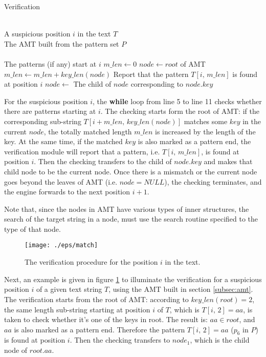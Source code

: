 \documentclass{article}
\begin{document}
\begin{algorithm}
  \caption{Verification}\scriptsize
  \label{alg:matching}
  \begin{algorithmic}[1]
    \REQUIRE ~~\\
    A suspicious position $i$ in the text $T$\\
    The AMT built from the pattern set $P$\\
    \ENSURE ~~\\
    The patterns (if any) start at $i$
    \STATE
    \STATE $m\_len \leftarrow 0$
    \STATE $node \leftarrow root$ of AMT
    \STATE
    \STATE $m\_len \leftarrow m\_len + key\_len(node)$
    \STATE Report that the pattern $T[i,\,m\_len]$ is found at position $i$
    \ENDIF
    \STATE $node \leftarrow$ The child of $node$ corresponding to $node.key$
    \ENDWHILE
  \end{algorithmic}
\end{algorithm}

For the suspicious position $i$, the \textbf{while} loop from line 5
to line 11 checks whether there are patterns starting at $i$. The
checking starts form the root of AMT: if the corresponding sub-string
$T[i+m\_len, \, key\_len(node)]$ matches some $key$ in the current
$node$, the totally matched length $m\_len$ is increased by the length
of the key. At the same time, if the matched $key$ is also marked as a
pattern end, the verification module will report that a pattern,
i.e. $T[i,\,m\_len]$, is found at position $i$. Then the checking
transfers to the child of $node.key$ and makes that child node to be
the current node. Once there is a mismatch or the current node goes
beyond the leaves of AMT (i.e.  $node = NULL$), the checking
terminates, and the engine forwards to the next position $i+1$.

Note that, since the nodes in AMT have various types of inner
structures, the search of the target string in a node, must use the
search routine specified to the type of that node.

\begin{figure}[htbp]
  \centering
  \texttt{[image: ./eps/match]}
  \caption{The verification procedure for the position $i$ in the
    text.}
  \label{fig:matching}
\end{figure}

Next, an example is given in figure \ref{fig:matching} to illuminate
the verification for a suspicious position $i$ of a given text string
$T$, using the AMT built in section \ref{subsec:amt}. The verification
starts from the root of AMT: according to $key\_len(root)=2$, the same
length sub-string starting at position $i$ of $T$, which is
$T[i,\,2]=aa$, is taken to check whether it's one of the keys in
root. The result is: $aa \in root$, and $aa$ is also marked as a
pattern end. Therefore the pattern $T[i,\,2]=aa$ ($p_6$ in $P$) is
found at position $i$. Then the checking transfers to $node_1$, which
is the child node of $root.aa$.
\end{document}
